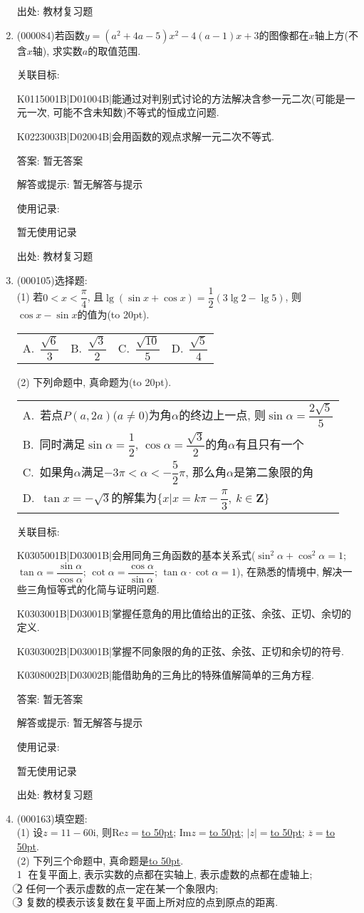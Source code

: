 \documentclass[10pt,a4paper]{article}
\newcommand{\blank}[1]{\underline{\hbox to #1pt{}}}
\newcommand{\bracket}[1]{(\hbox to #1pt{})}
\newcommand{\onech}[4]{\par\begin{tabular}{p{.9\textwidth}}
A.~#1\\
B.~#2\\
C.~#3\\
D.~#4
\end{tabular}}
\newcommand{\fourch}[4]{\par\begin{tabular}{p{.23\textwidth}p{.23\textwidth}p{.23\textwidth}p{.23\textwidth}}
A.~#1 &B.~#2& C.~#3& D.~#4
\end{tabular}}
\begin{document}
\begin{enumerate}[1.]
出处: 教材复习题
\item { (000084)}若函数$y=(a^2+4a-5)x^2-4(a-1)x+3$的图像都在$x$轴上方(不含$x$轴), 求实数$a$的取值范围.


关联目标:

K0115001B|D01004B|能通过对判别式讨论的方法解决含参一元二次(可能是一元一次, 可能不含未知数)不等式的恒成立问题.

K0223003B|D02004B|会用函数的观点求解一元二次不等式.

答案: 暂无答案

解答或提示: 暂无解答与提示

使用记录:

暂无使用记录


出处: 教材复习题
\item { (000105)}选择题:\\
(1) 若$0<x<\dfrac\pi 4$, 且$\lg (\sin x+\cos x)=\dfrac12(3\lg 2-\lg 5)$, 则$\cos x-\sin x$的值为\bracket{20}.
\fourch{$\dfrac{\sqrt{6}}3$}{$\dfrac{\sqrt{3}}2$}{$\dfrac{\sqrt{10}}5$}{$\dfrac{\sqrt{5}}4$}
(2) 下列命题中, 真命题为\bracket{20}.
\onech{若点$P(a, 2a)$($a\ne 0$)为角$\alpha$的终边上一点, 则$\sin \alpha=\dfrac{2\sqrt 5}5$}
{同时满足$\sin \alpha=\dfrac 12$, $\cos \alpha=\dfrac{\sqrt3}2$的角$\alpha$有且只有一个}
{如果角$\alpha$满足$-3\pi <\alpha<-\dfrac 52\pi$, 那么角$\alpha$是第二象限的角}
{$\tan x=-\sqrt 3$的解集为$\{x|x=k\pi -\dfrac\pi 3, \  k\in \mathbf{Z}\}$}


关联目标:

K0305001B|D03001B|会用同角三角函数的基本关系式($\sin^2\alpha+\cos^2\alpha=1$; $\tan\alpha=\dfrac{\sin\alpha}{\cos\alpha}$; $\cot\alpha=\dfrac{\cos\alpha}{\sin\alpha}$; $\tan\alpha\cdot \cot\alpha=1$), 在熟悉的情境中, 解决一些三角恒等式的化简与证明问题.

K0303001B|D03001B|掌握任意角的用比值给出的正弦、余弦、正切、余切的定义.

K0303002B|D03001B|掌握不同象限的角的正弦、余弦、正切和余切的符号.

K0308002B|D03002B|能借助角的三角比的特殊值解简单的三角方程.

答案: 暂无答案

解答或提示: 暂无解答与提示

使用记录:

暂无使用记录


出处: 教材复习题
\item { (000163)}填空题:\\
(1) 设$z=11-60\mathrm{i}$, 则$\mathrm{Re}z=$\blank{50}; $\mathrm{Im}z=$\blank{50}; $|z|=$\blank{50}; $\overline{z}=$\blank{50}.\\
(2) 下列三个命题中, 真命题是\blank{50}.\\
\textcircled{1} 在复平面上, 表示实数的点都在实轴上, 表示虚数的点都在虚轴上;\\
\textcircled{2} 任何一个表示虚数的点一定在某一个象限内;\\
\textcircled{3} 复数的模表示该复数在复平面上所对应的点到原点的距离.



\end{enumerate}
\end{document}
